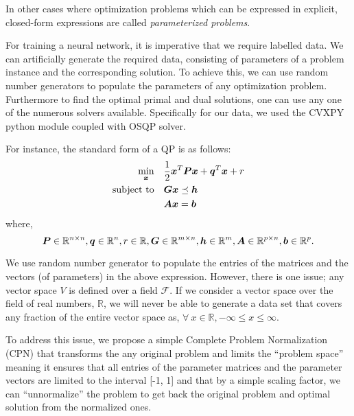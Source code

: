\documentclass{article} %
\begin{document}
In other cases where optimization problems which can be expressed in explicit, closed-form expressions are called \emph{parameterized problems}. 

For training a neural network, it is imperative that we require labelled data. We can artificially generate the required data, consisting of parameters of a problem instance and the corresponding solution. To achieve this, we can use random number generators to populate the parameters of any optimization problem. Furthermore to find the optimal primal and dual solutions, one can use any one of the numerous solvers available. Specifically for our data, we used the CVXPY python module coupled with OSQP solver. 

For instance, the standard form of a QP is as follows:
\begin{subequations}
   \begin{align}
      \min_{{\bm{x}}} \quad &\frac{1}{2}{\bm{x}}^T {\bm{P}} {\bm{x}} + {\bm{q}}^T {\bm{x}} + r \\
      \text{subject to} \quad &{\bm{G}} {\bm{x}} \preceq {\bm{h}} \\
      \quad &{\bm{A}} {\bm{x}} = {\bm{b}}  
   \end{align}
\end{subequations}
where, \[{\bm{P}} \in \mathbb{R}^{n \times n}, {\bm{q}} \in \mathbb{R}^{n}, r \in \mathbb{R}, {\bm{G}} \in \mathbb{R}^{m \times n}, {\bm{h}} \in \mathbb{R}^{m}, {\bm{A}} \in \mathbb{R}^{p \times n}, {\bm{b}} \in \mathbb{R}^{p}.\]

We use random number generator to populate the entries of the matrices and the vectors (of parameters) in the above expression. However, there is one issue; any vector space $V$ is defined over a field $\mathcal{F}$. If we consider a vector space over the field of real numbers, $\mathbb{R}$, we will never be able to generate a data set that covers any fraction of the entire vector space as, $\forall\ x \in \mathbb{R}, -\infty \leq x \leq \infty$. 

To address this issue, we propose a simple Complete Problem Normalization (CPN) that transforms the any original problem and limits the ``problem space'' meaning it ensures that all entries of the parameter matrices and the parameter vectors are limited to the interval [-1, 1] and that by a simple scaling factor, we can ``unnormalize'' the problem to get back the original problem and optimal solution from the normalized ones.
\end{document}
